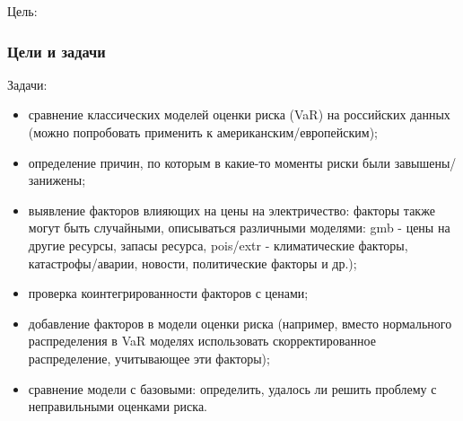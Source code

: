 \documentclass[c, dvipsnames]{beamer}  %
\begin{document}
\begin{frame}[shrink=3]
\begin{block}{Цель:}
\begin{itemize}
	\end{itemize}
	
\end{block}







\end{frame}

\begin{frame}[shrink=3]
\frametitle{Цели и задачи} 


\begin{block}{Задачи:}


	\begin{itemize}
		
		\item  сравнение классических моделей оценки риска (VaR) на российских данных (можно попробовать применить к американским/европейским);
		
		\item определение причин, по которым в какие-то моменты риски были завышены/занижены;  

				
		\item  выявление факторов влияющих на цены на электричество: факторы также могут быть случайными,  описываться различными моделями: gmb - цены на другие ресурсы, запасы ресурса, pois/extr - климатические факторы, катастрофы/аварии, новости, политические факторы и др.); 
		  
		

		\item  проверка коинтегрированности факторов с ценами;

		\item  добавление факторов в модели оценки риска (например, вместо нормального распределения в VaR моделях использовать скорректированное распределение, учитывающее эти факторы);
		\item  сравнение модели с базовыми: определить, удалось ли решить проблему с неправильными оценками риска. 		
		
		
	\end{itemize}
	
\end{block}
\end{frame}
\end{document}
